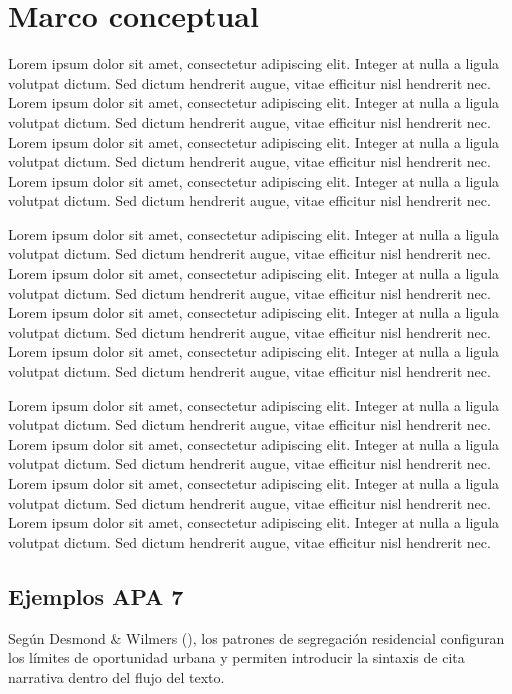 \documentclass[
  spanish,
  a4paper,
  oneside]{scrbook}
\begin{document}
\section{Marco conceptual}\label{marco-conceptual}

Lorem ipsum dolor sit amet, consectetur adipiscing elit. Integer at
nulla a ligula volutpat dictum. Sed dictum hendrerit augue, vitae
efficitur nisl hendrerit nec. Lorem ipsum dolor sit amet, consectetur
adipiscing elit. Integer at nulla a ligula volutpat dictum. Sed dictum
hendrerit augue, vitae efficitur nisl hendrerit nec. Lorem ipsum dolor
sit amet, consectetur adipiscing elit. Integer at nulla a ligula
volutpat dictum. Sed dictum hendrerit augue, vitae efficitur nisl
hendrerit nec. Lorem ipsum dolor sit amet, consectetur adipiscing elit.
Integer at nulla a ligula volutpat dictum. Sed dictum hendrerit augue,
vitae efficitur nisl hendrerit nec.

Lorem ipsum dolor sit amet, consectetur adipiscing elit. Integer at
nulla a ligula volutpat dictum. Sed dictum hendrerit augue, vitae
efficitur nisl hendrerit nec. Lorem ipsum dolor sit amet, consectetur
adipiscing elit. Integer at nulla a ligula volutpat dictum. Sed dictum
hendrerit augue, vitae efficitur nisl hendrerit nec. Lorem ipsum dolor
sit amet, consectetur adipiscing elit. Integer at nulla a ligula
volutpat dictum. Sed dictum hendrerit augue, vitae efficitur nisl
hendrerit nec. Lorem ipsum dolor sit amet, consectetur adipiscing elit.
Integer at nulla a ligula volutpat dictum. Sed dictum hendrerit augue,
vitae efficitur nisl hendrerit nec.

Lorem ipsum dolor sit amet, consectetur adipiscing elit. Integer at
nulla a ligula volutpat dictum. Sed dictum hendrerit augue, vitae
efficitur nisl hendrerit nec. Lorem ipsum dolor sit amet, consectetur
adipiscing elit. Integer at nulla a ligula volutpat dictum. Sed dictum
hendrerit augue, vitae efficitur nisl hendrerit nec. Lorem ipsum dolor
sit amet, consectetur adipiscing elit. Integer at nulla a ligula
volutpat dictum. Sed dictum hendrerit augue, vitae efficitur nisl
hendrerit nec. Lorem ipsum dolor sit amet, consectetur adipiscing elit.
Integer at nulla a ligula volutpat dictum. Sed dictum hendrerit augue,
vitae efficitur nisl hendrerit nec.

\subsection{Ejemplos APA 7}\label{ejemplos-apa-7}

Según Desmond \& Wilmers (), los
patrones de segregación residencial configuran los límites de
oportunidad urbana y permiten introducir la sintaxis de cita narrativa
dentro del flujo del texto.
\end{document}
